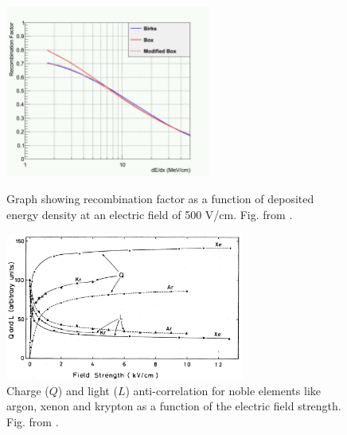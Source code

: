 \begin{figure}[thp] 
\centering    
\includegraphics[width=0.6\textwidth]{recomb_graph}
\caption[recomb_graph]{
Graph showing recombination factor as a function of deposited energy density at an electric field of 500 V/cm. 
Fig. from \cite{argoneut_recomb}.
}
\label{fig:recomb_graph}
\hfill
\break
\break
\centering    
\includegraphics[width=0.7\textwidth]{QLAnti}
\caption[QLAnti]{
Charge ($Q$) and light ($L$) anti-correlation for noble elements like argon, xenon and krypton as a function of the electric field strength.
Fig. from \cite{QLAnti}.
}
\label{fig:QLAnti}
\end{figure}


